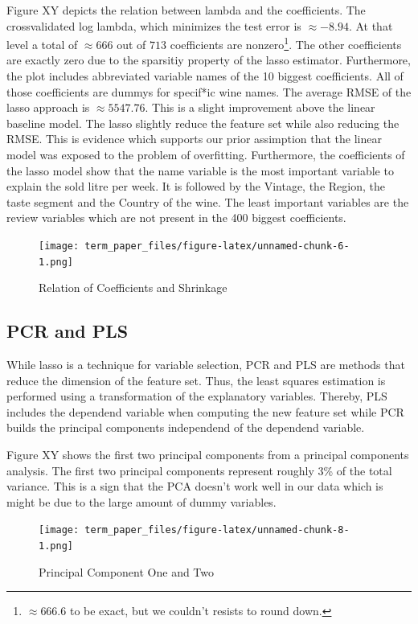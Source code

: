 \documentclass[11pt,]{article}
\let\rmarkdownfootnote\footnote%
\def\footnote{\protect\rmarkdownfootnote}
\begin{document}
Figure XY depicts the relation between lambda and the coefficients. The
crossvalidated log lambda, which minimizes the test error is
\(\approx -8.94\). At that level a total of \(\approx 666\) out of
\(713\) coefficients are
nonzero\footnote{$\approx 666.6$ to be exact, but we couldn't resists to round down.}.
The other coefficients are exactly zero due to the sparsitiy property of
the lasso estimator. Furthermore, the plot includes abbreviated variable
names of the 10 biggest coefficients. All of those coefficients are
dummys for specif*ic wine names. The average RMSE of the lasso approach
is \(\approx 5547.76\). This is a slight improvement above the linear
baseline model. The lasso slightly reduce the feature set while also
reducing the RMSE. This is evidence which supports our prior assimption
that the linear model was exposed to the problem of overfitting.
Furthermore, the coefficients of the lasso model show that the name
variable is the most important variable to explain the sold litre per
week. It is followed by the Vintage, the Region, the taste segment and
the Country of the wine. The least important variables are the review
variables which are not present in the 400 biggest coefficients.

\begin{figure}
\centering
\texttt{[image: term\_paper\_files/figure-latex/unnamed-chunk-6-1.png]}
\caption{Relation of Coefficients and Shrinkage}
\end{figure}

\hypertarget{pcr-and-pls}{%
\subsection{PCR and PLS}\label{pcr-and-pls}}

While lasso is a technique for variable selection, PCR and PLS are
methods that reduce the dimension of the feature set. Thus, the least
squares estimation is performed using a transformation of the
explanatory variables. Thereby, PLS includes the dependend variable when
computing the new feature set while PCR builds the principal components
independend of the dependend variable.

Figure XY shows the first two principal components from a principal
components analysis. The first two principal components represent
roughly 3\% of the total variance. This is a sign that the PCA doesn't
work well in our data which is might be due to the large amount of dummy
variables.

\begin{figure}
\centering
\texttt{[image: term\_paper\_files/figure-latex/unnamed-chunk-8-1.png]}
\caption{Principal Component One and Two}
\end{figure}
\end{document}
